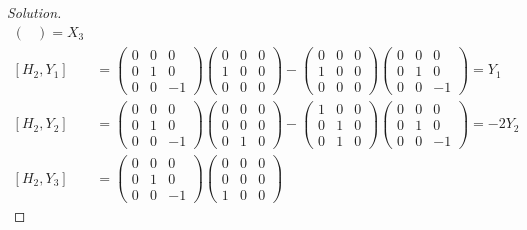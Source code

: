 \documentclass[12pt]{article}
\theoremstyle{definition}
\newenvironment{solution}
{\renewcommand\qedsymbol{$\blacksquare$}\begin{proof}[Solution]}
{\end{proof}}
\begin{document}
\begin{enumerate}
\begin{enumerate}[label=(\alph*)]
\begin{solution}
\begin{equation*}
\begin{split}
\begin{pmatrix}
                                \end{pmatrix}=X_3 \\
                                [H_2, Y_1] &=
                                \begin{pmatrix}0&0&0\\0&1&0\\0&0&-1
                                \end{pmatrix}\begin{pmatrix}0&0&0\\1&0&0\\0&0&0
                                \end{pmatrix}-\begin{pmatrix}0&0&0\\1&0&0\\0&0&0\end{pmatrix}
                                \begin{pmatrix}0&0&0\\0&1&0\\0&0&-1
                                \end{pmatrix}=Y_1 \\
                                [H_2, Y_2] &=
                                \begin{pmatrix}0&0&0\\0&1&0\\0&0&-1
                                \end{pmatrix}\begin{pmatrix}0&0&0\\0&0&0\\0&1&0
                                \end{pmatrix}-\begin{pmatrix}1&0&0\\0&1&0\\0&1&0\end{pmatrix}
                                \begin{pmatrix}0&0&0\\0&1&0\\0&0&-1
                                \end{pmatrix}=-2Y_2 \\
                                [H_2, Y_3] &=
                                \begin{pmatrix}0&0&0\\0&1&0\\0&0&-1
                                \end{pmatrix}\begin{pmatrix}0&0&0\\0&0&0\\1&0&0

\end{pmatrix}
\end{split}
\end{equation*}
\end{solution}
\end{enumerate}
\end{enumerate}
\end{document}
